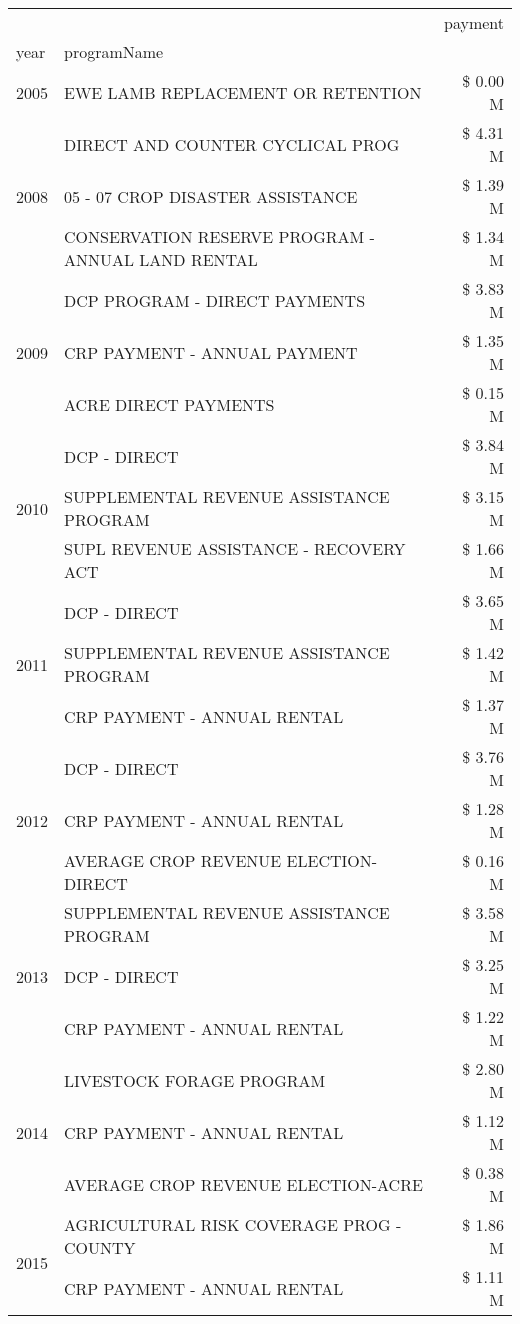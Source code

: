 \begin{tabular}{llr}
\toprule
 &  & payment \\
year & programName &  \\
\midrule
2005 & EWE LAMB REPLACEMENT OR RETENTION & \$ 0.00 M \\
\cline{1-3}
\multirow[t]{3}{*}{2008} & DIRECT AND COUNTER CYCLICAL PROG & \$ 4.31 M \\
 & 05 - 07 CROP DISASTER ASSISTANCE & \$ 1.39 M \\
 & CONSERVATION RESERVE PROGRAM - ANNUAL LAND RENTAL & \$ 1.34 M \\
\cline{1-3}
\multirow[t]{3}{*}{2009} & DCP PROGRAM - DIRECT PAYMENTS & \$ 3.83 M \\
 & CRP PAYMENT - ANNUAL PAYMENT & \$ 1.35 M \\
 & ACRE DIRECT PAYMENTS & \$ 0.15 M \\
\cline{1-3}
\multirow[t]{3}{*}{2010} & DCP - DIRECT & \$ 3.84 M \\
 & SUPPLEMENTAL REVENUE ASSISTANCE PROGRAM & \$ 3.15 M \\
 & SUPL REVENUE ASSISTANCE - RECOVERY ACT & \$ 1.66 M \\
\cline{1-3}
\multirow[t]{3}{*}{2011} & DCP - DIRECT & \$ 3.65 M \\
 & SUPPLEMENTAL REVENUE ASSISTANCE PROGRAM & \$ 1.42 M \\
 & CRP PAYMENT - ANNUAL RENTAL & \$ 1.37 M \\
\cline{1-3}
\multirow[t]{3}{*}{2012} & DCP - DIRECT & \$ 3.76 M \\
 & CRP PAYMENT - ANNUAL RENTAL & \$ 1.28 M \\
 & AVERAGE CROP REVENUE ELECTION-DIRECT & \$ 0.16 M \\
\cline{1-3}
\multirow[t]{3}{*}{2013} & SUPPLEMENTAL REVENUE ASSISTANCE PROGRAM & \$ 3.58 M \\
 & DCP - DIRECT & \$ 3.25 M \\
 & CRP PAYMENT - ANNUAL RENTAL & \$ 1.22 M \\
\cline{1-3}
\multirow[t]{3}{*}{2014} & LIVESTOCK FORAGE PROGRAM & \$ 2.80 M \\
 & CRP PAYMENT - ANNUAL RENTAL & \$ 1.12 M \\
 & AVERAGE CROP REVENUE ELECTION-ACRE & \$ 0.38 M \\
\cline{1-3}
\multirow[t]{3}{*}{2015} & AGRICULTURAL RISK COVERAGE PROG - COUNTY & \$ 1.86 M \\
 & CRP PAYMENT - ANNUAL RENTAL & \$ 1.11 M \\

\end{tabular}
